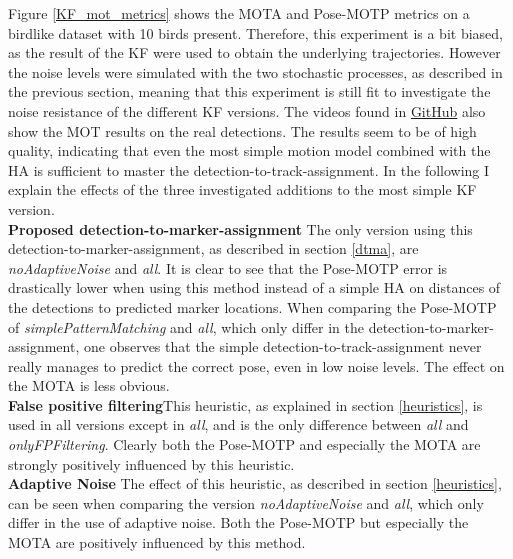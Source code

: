 \documentclass{article}
\begin{document}
Figure \ref{KF_mot_metrics} shows the MOTA and Pose-MOTP metrics on a birdlike dataset with 10 birds present. Therefore, this experiment is a bit biased, as the result of the KF were used to obtain the underlying trajectories. However the noise levels were simulated with the two stochastic processes, as described in the previous section, meaning that this experiment is still fit to investigate the noise resistance of the different KF versions. The videos found in \href{https://github.com/SimonGiebenhain/tracking}{GitHub} also show the MOT results on the real detections. The results seem to be of high quality, indicating that even the most simple motion model combined with the HA is sufficient to master the detection-to-track-assignment. In the following I explain the effects of the three investigated additions to the most simple KF version.\\ 

\textbf{Proposed detection-to-marker-assignment}  \space \space\space  The only version using this detection-to-marker-assignment, as described in section \ref{dtma}, are \emph{noAdaptiveNoise} and \emph{all}. It is clear to see that the Pose-MOTP error is drastically lower when using this method instead of a simple HA on distances of the detections to predicted marker locations. When comparing the Pose-MOTP of \emph{simplePatternMatching} and \emph{all}, which only differ in the detection-to-marker-assignment, one observes that the simple detection-to-track-assignment never really manages to predict the correct pose, even in low noise levels. The effect on the MOTA is less obvious. \\
\textbf{False positive filtering}\space \space\space This heuristic, as explained in section \ref{heuristics}, is used in all versions except in \emph{all}, and is the only difference between \emph{all} and \emph{onlyFPFiltering}. Clearly both the Pose-MOTP and especially the MOTA are strongly positively influenced by this heuristic.\\
\textbf{Adaptive Noise} \space \space\space The effect of this heuristic, as described in section \ref{heuristics}, can be seen when comparing the version \emph{noAdaptiveNoise} and \emph{all}, which only differ in the use of adaptive noise. Both the Pose-MOTP but especially the MOTA are positively influenced by this method.
\end{document}
